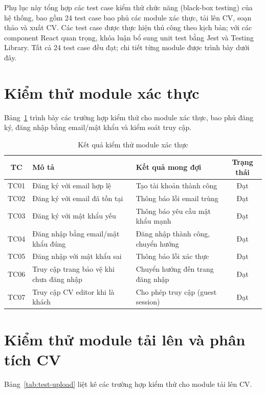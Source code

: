 \documentclass[../DoAn.tex]{subfiles}
\begin{document}
Phụ lục này tổng hợp các test case kiểm thử chức năng (black-box testing) của hệ thống, bao gồm 24 test case bao phủ các module xác thực, tải lên CV, soạn thảo và xuất CV. Các test case được thực hiện thủ công theo kịch bản; với các component React quan trọng, khóa luận bổ sung unit test bằng Jest và Testing Library. Tất cả 24 test case đều đạt; chi tiết từng module được trình bày dưới đây.

\section{Kiểm thử module xác thực}

Bảng~\ref{tab:test-auth} trình bày các trường hợp kiểm thử cho module xác thực, bao phủ đăng ký, đăng nhập bằng email/mật khẩu và kiểm soát truy cập.

\begin{table}[H]
\centering
\caption{Kết quả kiểm thử module xác thực}
\label{tab:test-auth}
\begin{tabular}{|c|p{5cm}|p{5cm}|c|}
\hline
\textbf{TC} & \textbf{Mô tả} & \textbf{Kết quả mong đợi} & \textbf{Trạng thái} \\
\hline
TC01 & Đăng ký với email hợp lệ & Tạo tài khoản thành công & Đạt \\
\hline
TC02 & Đăng ký với email đã tồn tại & Thông báo lỗi email trùng & Đạt \\
\hline
TC03 & Đăng ký với mật khẩu yếu & Thông báo yêu cầu mật khẩu mạnh & Đạt \\
\hline
TC04 & Đăng nhập bằng email/mật khẩu đúng & Đăng nhập thành công, chuyển hướng & Đạt \\
\hline
TC05 & Đăng nhập với mật khẩu sai & Thông báo lỗi xác thực & Đạt \\
\hline
TC06 & Truy cập trang bảo vệ khi chưa đăng nhập & Chuyển hướng đến trang đăng nhập & Đạt \\
\hline
TC07 & Truy cập CV editor khi là khách & Cho phép truy cập (guest session) & Đạt \\
\hline
\end{tabular}
\end{table}

\section{Kiểm thử module tải lên và phân tích CV}

Bảng~\ref{tab:test-upload} liệt kê các trường hợp kiểm thử cho module tải lên CV.
\end{document}
